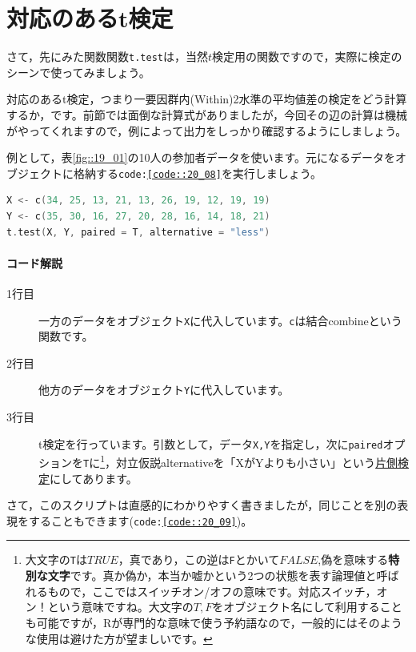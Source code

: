 \documentclass{ltjsbook}
\begin{document}
\section{対応のあるt検定}
さて，先にみた関数関数\texttt{t.test}は，当然$t$検定用の関数ですので，実際に検定のシーンで使ってみましょう。

対応のあるt検定，つまり一要因群内(Within)2水準の平均値差の検定をどう計算するか，です。前節では面倒な計算式がありましたが，今回その辺の計算は機械がやってくれますので，例によって出力をしっかり確認するようにしましょう。

例として，表\ref{fig::19_01}の10人の参加者データを使います。元になるデータをオブジェクトに格納する\texttt{code:\ref{code::20_08}}を実行しましょう。
\begin{lstlisting}[language=c++,label={code::20_08},caption={t検定を行う}]
X <- c(34, 25, 13, 21, 13, 26, 19, 12, 19, 19)
Y <- c(35, 30, 16, 27, 20, 28, 16, 14, 18, 21)
t.test(X, Y, paired = T, alternative = "less")
\end{lstlisting}

\paragraph{コード解説}
\begin{description}
    \item[1行目] 一方のデータをオブジェクト\texttt{X}に代入しています。\texttt{c}は結合combineという関数です。
    \item[2行目] 他方のデータをオブジェクト\texttt{Y}に代入しています。
    \item[3行目] t検定を行っています。引数として，データ\texttt{X,Y}を指定し，次に\texttt{paired}オプションを\texttt{T}に\footnote{大文字の\texttt{T}は$TRUE$，真であり，この逆は\texttt{F}とかいて$FALSE$,偽を意味する\textbf{特別な文字}です。真か偽か，本当か嘘かという2つの状態を表す論理値と呼ばれるもので，ここではスイッチオン/オフの意味です。対応スイッチ，オン！という意味ですね。大文字の$T,F$をオブジェクト名にして利用することも可能ですが，Rが専門的な意味で使う予約語なので，一般的にはそのような使用は避けた方が望ましいです。}，対立仮説alternativeを「XがYよりも小さい」という\underline{片側検定}にしてあります。
\end{description}
さて，このスクリプトは直感的にわかりやすく書きましたが，同じことを別の表現をすることもできます(\texttt{code:\ref{code::20_09}})。
\end{document}
